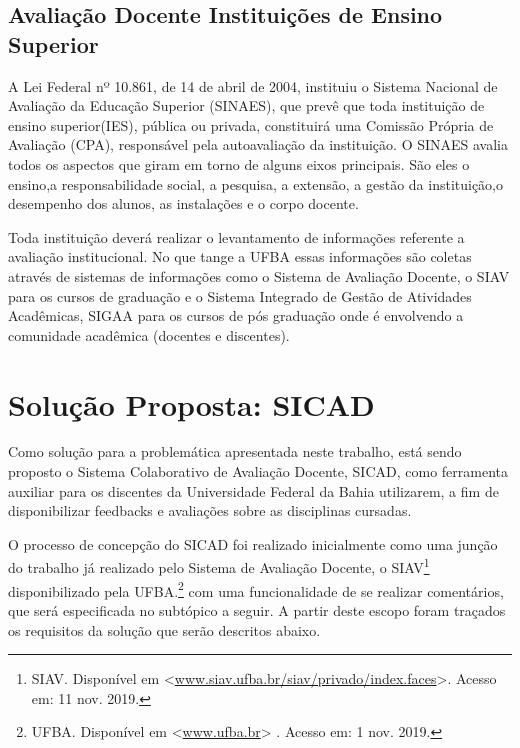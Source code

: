 \documentclass[12pt, a4paper]{report}
\begin{document}
\section{Avaliação Docente Instituições de Ensino Superior}

 A Lei Federal nº 10.861, de 14 de abril de 2004, instituiu o Sistema Nacional de Avaliação da Educação Superior (SINAES), que prevê que toda instituição de ensino superior(IES), pública ou privada, constituirá uma Comissão Própria de Avaliação (CPA), responsável pela autoavaliação da instituição.  O SINAES avalia todos os aspectos que giram em torno de alguns eixos principais. São eles o ensino,a responsabilidade social, a pesquisa, a extensão, a gestão da instituição,o desempenho dos alunos, as instalações e o corpo docente.
 
 Toda instituição deverá realizar o levantamento de informações referente a avaliação institucional. No que tange a UFBA essas informações são coletas através de sistemas de informações como o Sistema de Avaliação Docente, o SIAV para os cursos de graduação e o Sistema Integrado de Gestão de Atividades Acadêmicas, SIGAA para os cursos de pós graduação onde é envolvendo a comunidade acadêmica (docentes e discentes).
 
 



\chapter{Solução Proposta: SICAD}

Como solução para a problemática apresentada neste trabalho, está sendo proposto o Sistema Colaborativo de Avaliação Docente, SICAD, como ferramenta auxiliar para os discentes da Universidade Federal da Bahia utilizarem, a fim de disponibilizar feedbacks e avaliações sobre as disciplinas cursadas. 

O processo de concepção do SICAD foi realizado inicialmente como uma junção do trabalho já realizado pelo Sistema de Avaliação Docente, o SIAV\footnote{SIAV. Disponível em <\url{www.siav.ufba.br/siav/privado/index.faces}>. Acesso em: 11 nov. 2019.} disponibilizado pela \ac{UFBA}.\footnote{UFBA. Disponível em <\url{www.ufba.br}> . Acesso em: 1 nov. 2019.} com uma funcionalidade de se realizar comentários, que será especificada no subtópico a seguir. A partir deste escopo foram traçados os requisitos da solução que serão descritos abaixo.
\end{document}
